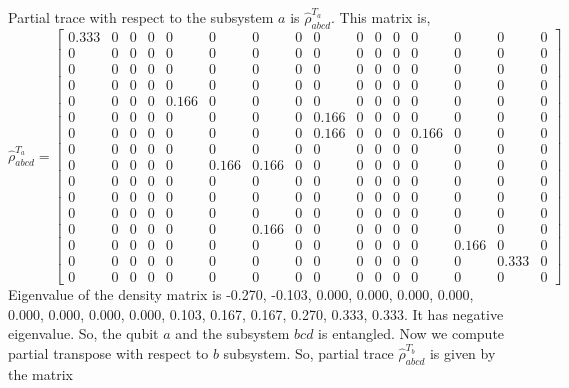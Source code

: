 \documentclass{scrartcl}
\begin{document}
Partial trace with respect to the subsystem $a$ is $\hat{\rho}^{T_a}_{abcd}$. This matrix is, 
\begin{equation*}
	\hat{\rho}^{T_a}_{abcd} = \left[\begin{array}{cccccccccccccccc}0.333 & 0 & 0 & 0 & 0 & 0 & 0 & 0 & 0 & 0 & 0 & 0 & 0 & 0 & 0 & 0\\0 & 0 & 0 & 0 & 0 & 0 & 0 & 0 & 0 & 0 & 0 & 0 & 0 & 0 & 0 & 0\\0 & 0 & 0 & 0 & 0 & 0 & 0 & 0 & 0 & 0 & 0 & 0 & 0 & 0 & 0 & 0\\0 & 0 & 0 & 0 & 0 & 0 & 0 & 0 & 0 & 0 & 0 & 0 & 0 & 0 & 0 & 0\\0 & 0 & 0 & 0 & 0.166 & 0 & 0 & 0 & 0 & 0 & 0 & 0 & 0 & 0 & 0 & 0\\0 & 0 & 0 & 0 & 0 & 0 & 0 & 0 & 0.166 & 0 & 0 & 0 & 0 & 0 & 0 & 0\\0 & 0 & 0 & 0 & 0 & 0 & 0 & 0 & 0.166 & 0 & 0 & 0 & 0.166 & 0 & 0 & 0\\0 & 0 & 0 & 0 & 0 & 0 & 0 & 0 & 0 & 0 & 0 & 0 & 0 & 0 & 0 & 0\\0 & 0 & 0 & 0 & 0 & 0.166 & 0.166 & 0 & 0 & 0 & 0 & 0 & 0 & 0 & 0 & 0\\0 & 0 & 0 & 0 & 0 & 0 & 0 & 0 & 0 & 0 & 0 & 0 & 0 & 0 & 0 & 0\\0 & 0 & 0 & 0 & 0 & 0 & 0 & 0 & 0 & 0 & 0 & 0 & 0 & 0 & 0 & 0\\0 & 0 & 0 & 0 & 0 & 0 & 0 & 0 & 0 & 0 & 0 & 0 & 0 & 0 & 0 & 0\\0 & 0 & 0 & 0 & 0 & 0 & 0.166 & 0 & 0 & 0 & 0 & 0 & 0 & 0 & 0 & 0\\0 & 0 & 0 & 0 & 0 & 0 & 0 & 0 & 0 & 0 & 0 & 0 & 0 & 0.166 & 0 & 0\\0 & 0 & 0 & 0 & 0 & 0 & 0 & 0 & 0 & 0 & 0 & 0 & 0 & 0 & 0.333 & 0\\0 & 0 & 0 & 0 & 0 & 0 & 0 & 0 & 0 & 0 & 0 & 0 & 0 & 0 & 0 & 0\end{array}\right]
\end{equation*}
Eigenvalue of the density matrix is -0.270, -0.103, 0.000, 0.000, 0.000, 0.000, 0.000, 0.000, 0.000, 0.000, 0.103, 0.167, 0.167, 0.270, 0.333, 0.333. It has negative eigenvalue. So, the qubit $a$ and the subsystem $bcd$ is entangled. Now we compute partial transpose with respect to $b$ subsystem. So, partial trace $\hat{\rho}^{T_b}_{abcd}$ is given by the matrix
\end{document}
